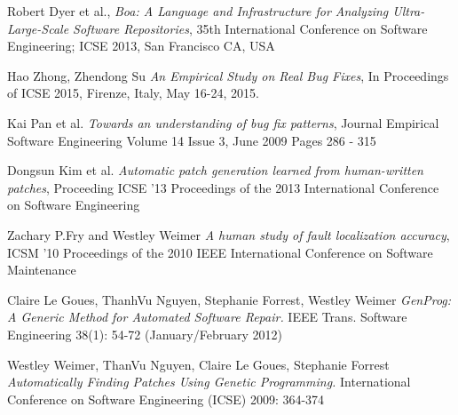 \documentclass{sig-alternate-05-2015}
\begin{document}
%

%
%


\begin{thebibliography}{9}

  Robert Dyer et al.,
  \emph{Boa: A Language and Infrastructure for Analyzing Ultra-Large-Scale Software Repositories},
35th International Conference on Software Engineering; ICSE 2013, San Francisco CA, USA

Hao Zhong, Zhendong Su
\emph{An Empirical Study on Real Bug Fixes},
In Proceedings of ICSE 2015, Firenze, Italy, May 16-24, 2015.

Kai Pan et al.
\emph{Towards an understanding of bug fix patterns},
Journal
Empirical Software Engineering
Volume 14 Issue 3, June 2009 
Pages 286 - 315 

Dongsun Kim et al.
\emph{Automatic patch generation learned from human-written patches},
Proceeding
ICSE '13 Proceedings of the 2013 International Conference on Software Engineering

Zachary P.Fry and Westley Weimer
\emph{A human study of fault localization accuracy},
ICSM '10 Proceedings of the 2010 IEEE International Conference on Software Maintenance

Claire Le Goues, ThanhVu Nguyen, Stephanie Forrest, Westley Weimer
\emph{GenProg: A Generic Method for Automated Software Repair.} 
IEEE Trans. Software Engineering 38(1): 54-72 (January/February 2012) 

Westley Weimer, ThanVu Nguyen, Claire Le Goues, Stephanie Forrest
\emph{Automatically Finding Patches Using Genetic Programming.}
International Conference on Software Engineering (ICSE) 2009: 364-374

\end{thebibliography}

\end{document}
